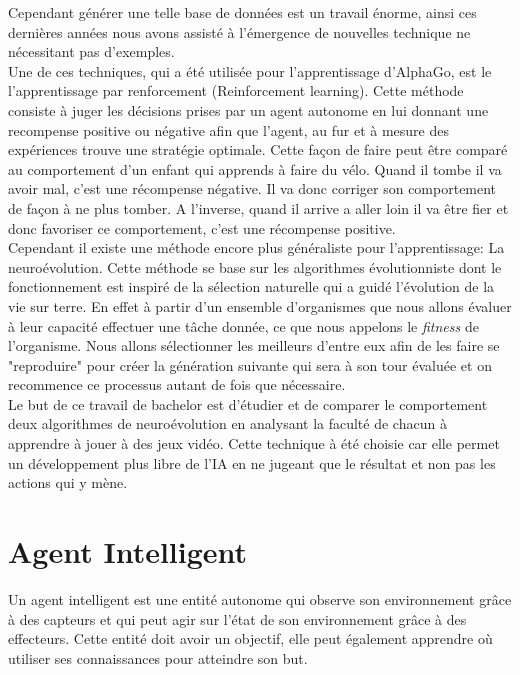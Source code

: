 \documentclass{article}
\begin{document}
Cependant générer une telle base de données est un travail énorme, ainsi ces dernières années nous avons assisté à l'émergence de nouvelles technique ne nécessitant pas d'exemples.\\

Une de ces techniques, qui a été utilisée pour l'apprentissage d'AlphaGo\cite{alphago}, est le l'apprentissage par renforcement (Reinforcement learning). Cette méthode consiste à juger les décisions prises par un agent autonome en lui donnant une recompense positive ou négative afin que l'agent, au fur et à mesure des expériences trouve une stratégie optimale.\cite{wikirl} Cette façon de faire peut être comparé au comportement d'un enfant qui apprends à faire du vélo. Quand il tombe il va avoir mal, c'est une récompense négative. Il va donc corriger son comportement de façon à ne plus tomber. A l'inverse, quand il arrive a aller loin il va être fier et donc favoriser ce comportement, c'est une récompense positive.\\

Cependant il existe une méthode encore plus généraliste pour l'apprentissage: La neuroévolution. Cette méthode se base sur les algorithmes évolutionniste dont le fonctionnement est inspiré de la sélection naturelle qui a guidé l'évolution de la vie sur terre. En effet à partir d'un ensemble d'organismes que nous allons évaluer à leur capacité effectuer une tâche donnée, ce que nous appelons le \textit{fitness} de l'organisme. Nous allons sélectionner les meilleurs d'entre eux afin de les faire se "reproduire" pour créer la génération suivante qui sera à son tour évaluée et on recommence ce processus autant de fois que nécessaire.\cite{wikineuroevolution}\\

Le but de ce travail de bachelor est d'étudier et de comparer le comportement deux algorithmes de neuroévolution en analysant la faculté de chacun à apprendre à jouer à des jeux vidéo. Cette technique à été choisie car elle permet un développement plus libre de l'IA en ne jugeant que le résultat et non pas les actions qui y mène.
\newpage

\section{Agent Intelligent}

Un agent intelligent est une entité autonome qui observe son environnement grâce à des capteurs et qui peut agir sur l'état de son environnement grâce à des effecteurs. Cette entité doit avoir un objectif, elle peut également apprendre où utiliser ses connaissances pour atteindre son but.\cite{wikiia}\\
\end{document}
